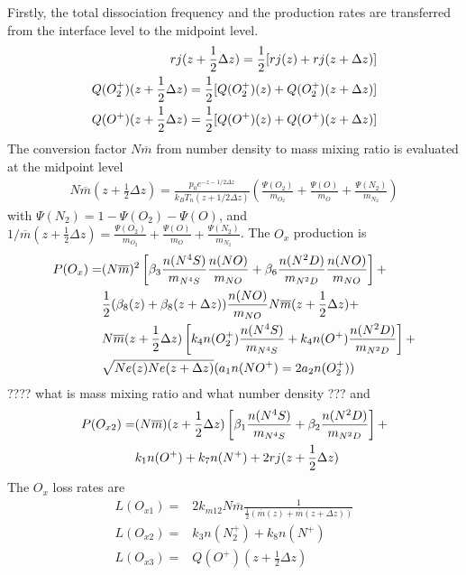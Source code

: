 Firstly, the total dissociation frequency and the production rates
are transferred from the interface level to the midpoint level.
%
\begin{align}
  rj(z+\frac{1}{2}\Delta z ) = \frac{1}{2} [rj(z)+ rj(z+\Delta z)] \notag \\
  Q(O_2^+)(z+\frac{1}{2}\Delta z ) = \frac{1}{2} [Q(O_2^+)(z)+ Q(O_2^+)(z+\Delta z)] \notag \\
  Q(O^+)(z+\frac{1}{2}\Delta z ) = \frac{1}{2} [Q(O^+)(z)+ Q(O^+)(z+\Delta z)]
\end{align}
%
The conversion factor $N\overline{m}$ from number density to mass
mixing ratio is evaluated at the midpoint level
%
\begin{align}
  N\overline{m}(z+\frac{1}{2}\Delta z) = \frac{p_0 e^{-z-1/2\Delta z}}{k_B T_n(z+1/2\Delta
  z)}\left( \frac{\Psi(O_2)}{m_{O_2}}+ \frac{\Psi(O)}{m_{O}}+\frac{\Psi(N_2)}{m_{N_2}}\right)
\end{align}
%
with $\Psi(N_2) = 1- \Psi(O_2 )- \Psi(O)$, and
$1/\overline{m}(z+\frac{1}{2}\Delta z) =\frac{\Psi(O_2)}{m_{O_2}}+
\frac{\Psi(O)}{m_{O}}+\frac{\Psi(N_2)}{m_{N_2}} $. The $O_x$
production is
%
\begin{align}
  P(O_x) = & (N\overline{m})^2 \left[ \beta_3 \frac{n(N^4S)}{m_{N^4S}}\frac{n(NO)}{m_{NO}}
     + \beta_6 \frac{n(N^2D)}{m_{N^2D}}\frac{n(NO)}{m_{NO}}\right] +
     \notag \\
  & \frac{1}{2}( \beta_8(z) + \beta_8(z+\Delta
    z))\frac{n(NO)}{m_{NO}}N\overline{m}(z+\frac{1}{2}\Delta z) + \notag \\
  & N\overline{m}(z+\frac{1}{2}\Delta z) \left[ k_4 n(O_2^+)\frac{n(N^4S)}{m_{N^4S}} +
     k_4 n(O^+)\frac{n(N^2D)}{m_{N^2D}}\right] + \notag \\
  & \sqrt{Ne(z)Ne(z+\Delta z)}(a_1 n(NO^+)= 2 a_2 n(O_2^+))
\end{align}
%
???? what is mass mixing ratio and what number density ??? and
%
\begin{align}
 P(O_{x2}) = & (N\overline{m})(z+\frac{1}{2}\Delta z)\left[ \beta_1 \frac{n(N^4S)}{m_{N^4S}}
    + \beta_2 \frac{n(N^2D)}{m_{N^2D}}\right] + \notag \\
    & k_1 n(O^+) + k_7 n(N^+) + 2 rj(z+\frac{1}{2} \Delta z)
\end{align}
%
The $O_x$ loss rates are
%
\begin{align}
   L(O_{x1}) = & 2 k_{m12} N\overline{m} \frac{1}{\frac{1}{2}(\overline{m}(z) + \overline{m}(z+\Delta
   z))} \\
   L(O_{x2}) = & k_3 n(N_2^+) + k_8 n(N^+) \\
   L(O_{x3}) = & Q(O^+) (z+\frac{1}{2} \Delta z)
\end{align}
